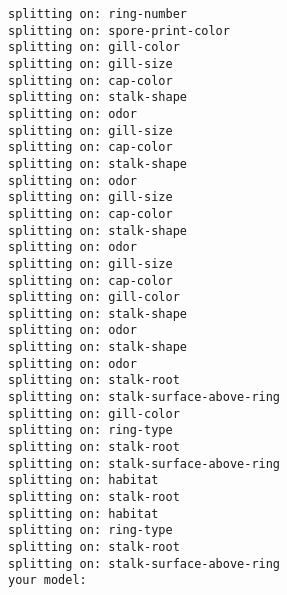 \documentclass[11pt]{article}
\begin{document}
\begin{Verbatim}[commandchars=\\\{\}]
splitting on: ring-number
splitting on: spore-print-color
splitting on: gill-color
splitting on: gill-size
splitting on: cap-color
splitting on: stalk-shape
splitting on: odor
splitting on: gill-size
splitting on: cap-color
splitting on: stalk-shape
splitting on: odor
splitting on: gill-size
splitting on: cap-color
splitting on: stalk-shape
splitting on: odor
splitting on: gill-size
splitting on: cap-color
splitting on: gill-color
splitting on: stalk-shape
splitting on: odor
splitting on: stalk-shape
splitting on: odor
splitting on: stalk-root
splitting on: stalk-surface-above-ring
splitting on: gill-color
splitting on: ring-type
splitting on: stalk-root
splitting on: stalk-surface-above-ring
splitting on: habitat
splitting on: stalk-root
splitting on: habitat
splitting on: ring-type
splitting on: stalk-root
splitting on: stalk-surface-above-ring
your model: 



\end{Verbatim}
\end{document}
